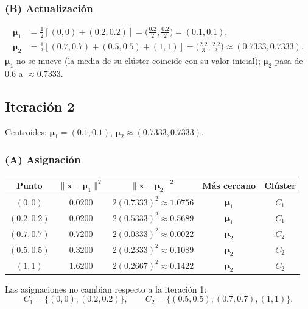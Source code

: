 \subsubsection*{(B) Actualización}
\begin{align*}
    \boldsymbol{\mu}_1 &= \tfrac{1}{2} [(0, 0) + (0.2, 0.2)] = \big(\tfrac{0.2}{2}, \tfrac{0.2}{2}\big) = (0.1, 0.1), \\
    \boldsymbol{\mu}_2 &= \tfrac{1}{3} [(0.7, 0.7) + (0.5, 0.5) + (1, 1)] = \big(\tfrac{2.2}{3}, \tfrac{2.2}{3}\big) \approx (0.7333, 0.7333).
\end{align*}
$\boldsymbol{\mu}_1$ no se mueve (la media de su clúster coincide con su valor inicial); $\boldsymbol{\mu}_2$ pasa de $0.6$ a $\approx 0.7333$.

\subsection*{Iteración 2}
Centroides: $\boldsymbol{\mu}_1 = (0.1, 0.1)$, $\boldsymbol{\mu}_2 \approx (0.7333, 0.7333)$.

\subsubsection*{(A) Asignación}
\begin{center}
    \begin{tabular}{ccccc}
        \toprule
        Punto & $\| \mathbf{x} - \boldsymbol{\mu}_1 \|^2$ & $\| \mathbf{x} - \boldsymbol{\mu}_2 \|^2$ & Más cercano & Clúster \\
        \midrule
        $(0, 0)$     & $0.0200$ & $2(0.7333)^2 \approx 1.0756$ & $\boldsymbol{\mu}_1$ & $C_1$ \\
        $(0.2, 0.2)$ & $0.0200$ & $2(0.5333)^2 \approx 0.5689$ & $\boldsymbol{\mu}_1$ & $C_1$ \\
        $(0.7, 0.7)$ & $0.7200$ & $2(0.0333)^2 \approx 0.0022$ & $\boldsymbol{\mu}_2$ & $C_2$ \\
        $(0.5, 0.5)$ & $0.3200$ & $2(0.2333)^2 \approx 0.1089$ & $\boldsymbol{\mu}_2$ & $C_2$ \\
        $(1, 1)$     & $1.6200$ & $2(0.2667)^2 \approx 0.1422$ & $\boldsymbol{\mu}_2$ & $C_2$ \\
        \bottomrule
    \end{tabular}
\end{center}
Las asignaciones no cambian respecto a la iteración 1:
\[
    C_1 = \{(0, 0), (0.2, 0.2)\}, \qquad C_2 = \{(0.5, 0.5), (0.7, 0.7), (1, 1)\}.
\]


